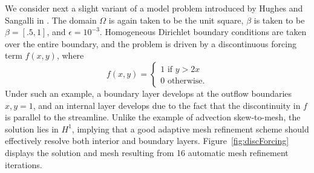 \documentclass[final,leqno]{siamltex}
\newcommand{\nor}[1]{\left\| #1 \right\|}
\begin{document}
We consider next a slight variant of a model problem introduced by Hughes and Sangalli in \cite{HughesVMS}.  The domain $\Omega$ is again taken to be the unit square, $\beta$ is taken to be $\beta = [.5,1]$, and $\epsilon = 10^{-3}$.  Homogeneous Dirichlet boundary conditions are taken over the entire boundary, and the problem is driven by a discontinuous forcing term $f(x,y)$, where
\[
f(x,y) = \begin{cases}
1 \text{ if } y > 2x \\
0 \text{ otherwise}.
\end{cases}
\]
Under such an example, a boundary layer develops at the outflow boundaries $x,y = 1$, and an internal layer develops due to the fact that the discontinuity in $f$ is parallel to the streamline.  Unlike the example of advection skew-to-mesh, the solution lies in $H^1$, implying that a good adaptive mesh refinement scheme should effectively resolve both interior and boundary layers.  
Figure~\ref{fig:discForcing} displays the solution and mesh resulting from 16 automatic mesh refinement iterations.  
%
\end{document}
